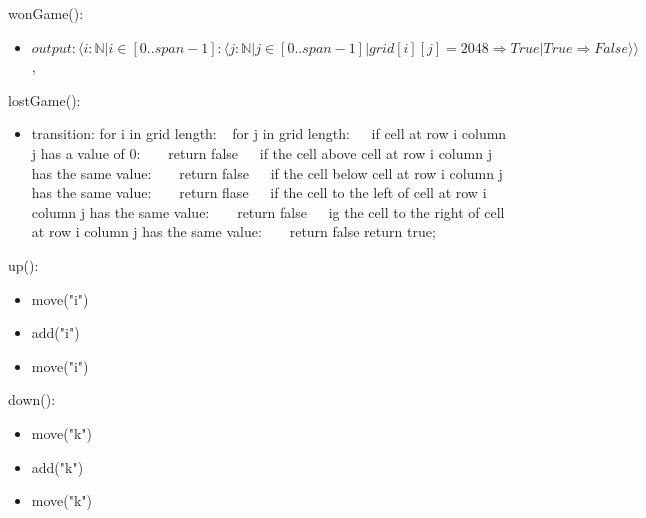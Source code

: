 \documentclass[12pt]{article}
\begin{document}
\noindent wonGame():
\begin{itemize}
\item $output: \langle i : \mathbb{N} | i \in [0..span-1]: \langle j  : \mathbb{N} | j \in [0..span-1]| grid[i][j] = 2048 \Rightarrow True| True \Rightarrow False\rangle\rangle$,
\end{itemize}

\noindent lostGame():
\begin{itemize}
\item transition:\newline
      for i in grid length:\newline
      $~~$ for j in grid length:\newline
      $~~$$~~$ if cell at row i column j has a value of 0:\newline
      $~~$$~~$$~~$ return false\newline
      $~~$$~~$ if the cell above cell at row i column j has the same value:\newline
      $~~$$~~$$~~$ return false\newline
      $~~$$~~$ if the cell below cell at row i column j has the same value:\newline
      $~~$$~~$$~~$ return flase\newline
      $~~$$~~$ if the cell to the left of cell at row i column j has the same value:\newline
      $~~$$~~$$~~$ return false\newline
      $~~$$~~$ ig the cell to the right of cell at row i column j has the same value:\newline
      $~~$$~~$$~~$ return false\newline
      return true;\newline
\end{itemize}

\noindent up():
\begin{itemize}
\item \mbox{move("i")}
\item \mbox{add("i")}
\item \mbox{move("i")}
\end{itemize}

\noindent down():
\begin{itemize}
\item \mbox{move("k")}
\item \mbox{add("k")}
\item \mbox{move("k")}
\end{itemize}
\end{document}
